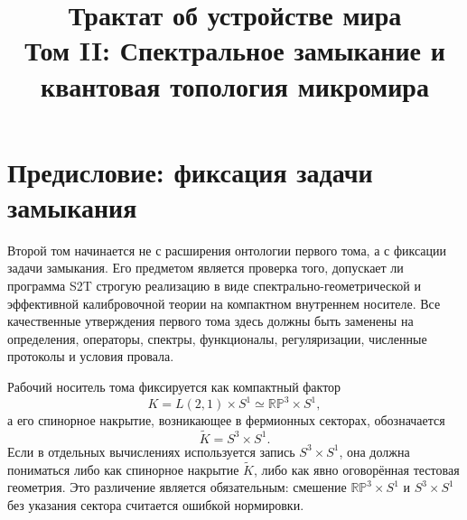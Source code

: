 \documentclass[12pt,a4paper]{report}
\title{Трактат об устройстве мира\\
Том II: Спектральное замыкание и квантовая топология микромира}
\author{}
\date{}
\theoremstyle{remark}
\begin{document}
\hypersetup{pageanchor=false}
\maketitle
\clearpage
\hypersetup{pageanchor=true}
\setcounter{page}{1}
\tableofcontents
\clearpage
{}

\chapter*{Предисловие: фиксация задачи замыкания}

Второй том начинается не с расширения онтологии первого тома, а с фиксации задачи замыкания. Его предметом является проверка того, допускает ли программа S2T строгую реализацию в виде спектрально-геометрической и эффективной калибровочной теории на компактном внутреннем носителе. Все качественные утверждения первого тома здесь должны быть заменены на определения, операторы, спектры, функционалы, регуляризации, численные протоколы и условия провала.

Рабочий носитель тома фиксируется как компактный фактор
\begin{equation}
    K = L(2,1)\times S^1 \simeq \mathbb{RP}^3\times S^1,
\end{equation}
а его спинорное накрытие, возникающее в фермионных секторах, обозначается
\begin{equation}
    \widetilde K = S^3\times S^1.
\end{equation}
Если в отдельных вычислениях используется запись \(S^3\times S^1\), она должна пониматься либо как спинорное накрытие \(\widetilde K\), либо как явно оговорённая тестовая геометрия. Это различение является обязательным: смешение \(\mathbb{RP}^3\times S^1\) и \(S^3\times S^1\) без указания сектора считается ошибкой нормировки.
\end{document}
